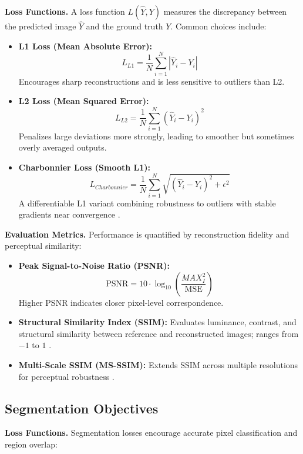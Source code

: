 \textbf{Loss Functions.}
A loss function \( L(\hat{Y}, Y) \) measures the discrepancy between the predicted image \(\hat{Y}\) and the ground truth \(Y\).
Common choices include:

\begin{itemize}
    \item \textbf{L1 Loss (Mean Absolute Error):}
    \[
    L_{L1} = \frac{1}{N} \sum_{i=1}^{N} |\hat{Y}_i - Y_i|
    \]
    Encourages sharp reconstructions and is less sensitive to outliers than L2.

    \item \textbf{L2 Loss (Mean Squared Error):}
    \[
    L_{L2} = \frac{1}{N} \sum_{i=1}^{N} (\hat{Y}_i - Y_i)^2
    \]
    Penalizes large deviations more strongly, leading to smoother but sometimes overly averaged outputs.

    \item \textbf{Charbonnier Loss (Smooth L1):}
    \[
    L_{Charbonnier} = \frac{1}{N} \sum_{i=1}^{N} \sqrt{(\hat{Y}_i - Y_i)^2 + \epsilon^2}
    \]
    A differentiable L1 variant combining robustness to outliers with stable gradients near convergence \cite{charbonnier1994two}.
\end{itemize}

\textbf{Evaluation Metrics.}
Performance is quantified by reconstruction fidelity and perceptual similarity:

\begin{itemize}
    \item \textbf{Peak Signal-to-Noise Ratio (PSNR):}
    \[
    \text{PSNR} = 10 \cdot \log_{10}\!\left(\frac{MAX_I^2}{\text{MSE}}\right)
    \]
    Higher PSNR indicates closer pixel-level correspondence.

    \item \textbf{Structural Similarity Index (SSIM):}
    Evaluates luminance, contrast, and structural similarity between reference and reconstructed images; ranges from \(-1\) to \(1\) \cite{wang2004ssim}.

    \item \textbf{Multi-Scale SSIM (MS-SSIM):}
    Extends SSIM across multiple resolutions for perceptual robustness \cite{wang2003multiscale}.
\end{itemize}

\subsection{Segmentation Objectives}

\textbf{Loss Functions.}
Segmentation losses encourage accurate pixel classification and region overlap:

